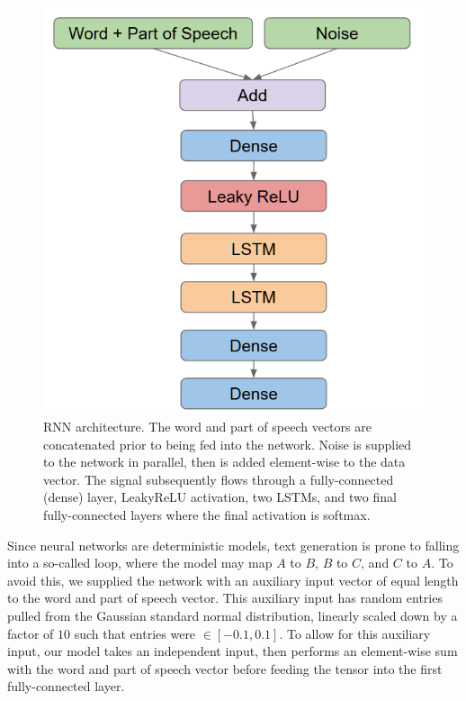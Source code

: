 \documentclass[conference]{IEEEtran}
\begin{document}
\begin{figure}[!htbp]
\caption{RNN architecture.  The word and part of speech vectors are concatenated prior to being fed into the network. Noise is supplied to the network in parallel, then is added element-wise to the data vector. The signal subsequently flows through a fully-connected (dense) layer, LeakyReLU activation, two LSTMs, and two final fully-connected layers where the final activation is softmax.}
\label{fig:model}
\centering
\vspace{2mm}
\includegraphics[scale=0.5]{rnn}
\end{figure}
Since neural networks are deterministic models, text generation is prone to falling into a so-called loop, where the model may map $A$ to $B$, $B$ to $C$, and $C$ to $A$.  To avoid this, we supplied the network with an auxiliary input vector of equal length to the word and part of speech vector.  This auxiliary input has random entries pulled from the Gaussian standard normal distribution, linearly scaled down by a factor of $10$ such that entries were $\in[-0.1, 0.1]$.  To allow for this auxiliary input, our model takes an independent input, then performs an element-wise sum with the word and part of speech vector before feeding the tensor into the first fully-connected layer.
\end{document}
